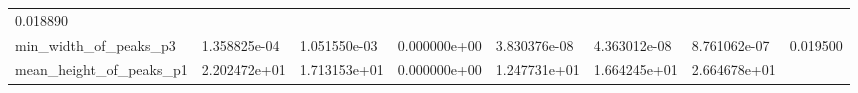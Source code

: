 \documentclass[11pt]{article}
\begin{document}
\begin{longtable}[]{@{}llllllll@{}}
\begin{minipage}[t]{0.08\columnwidth}
0.018890\strut
\end{minipage}\tabularnewline
\begin{minipage}[t]{0.16\columnwidth}\raggedright
min\_width\_of\_peaks\_p3\strut
\end{minipage} & \begin{minipage}[t]{0.09\columnwidth}\raggedright
1.358825e-04\strut
\end{minipage} & \begin{minipage}[t]{0.09\columnwidth}\raggedright
1.051550e-03\strut
\end{minipage} & \begin{minipage}[t]{0.09\columnwidth}\raggedright
0.000000e+00\strut
\end{minipage} & \begin{minipage}[t]{0.09\columnwidth}\raggedright
3.830376e-08\strut
\end{minipage} & \begin{minipage}[t]{0.09\columnwidth}\raggedright
4.363012e-08\strut
\end{minipage} & \begin{minipage}[t]{0.09\columnwidth}\raggedright
8.761062e-07\strut
\end{minipage} & \begin{minipage}[t]{0.08\columnwidth}\raggedright
0.019500\strut
\end{minipage}\tabularnewline
\begin{minipage}[t]{0.16\columnwidth}\raggedright
mean\_height\_of\_peaks\_p1\strut
\end{minipage} & \begin{minipage}[t]{0.09\columnwidth}\raggedright
2.202472e+01\strut
\end{minipage} & \begin{minipage}[t]{0.09\columnwidth}\raggedright
1.713153e+01\strut
\end{minipage} & \begin{minipage}[t]{0.09\columnwidth}\raggedright
0.000000e+00\strut
\end{minipage} & \begin{minipage}[t]{0.09\columnwidth}\raggedright
1.247731e+01\strut
\end{minipage} & \begin{minipage}[t]{0.09\columnwidth}\raggedright
1.664245e+01\strut
\end{minipage} & \begin{minipage}[t]{0.09\columnwidth}\raggedright
2.664678e+01\strut
\end{minipage} & \begin{minipage}[t]{0.08\columnwidth}\raggedright

\end{minipage}
\end{longtable}
\end{document}

